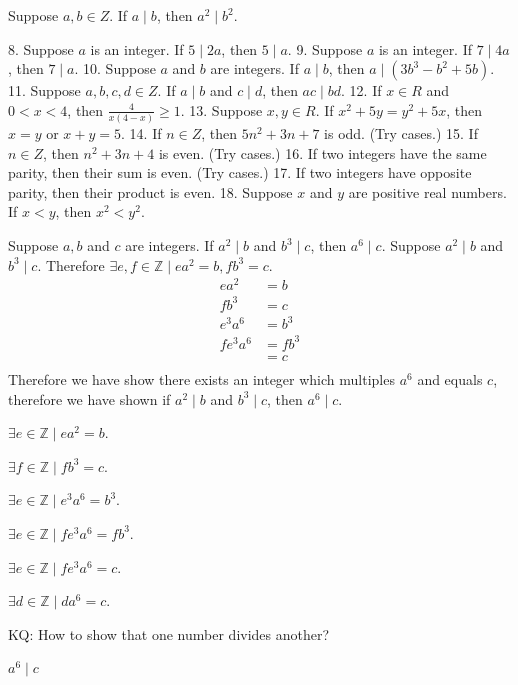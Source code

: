 \documentclass[openany, 12pt]{book}
\begin{document}
\begin{exercise}{}{}
	Suppose $a, b \in Z$. If $a \mid b$, then $a^2 \mid b^2$.
	\tcblower
\end{exercise}
8. Suppose $a$ is an integer. If $5 \mid 2 a$, then $5 \mid a$.
9. Suppose $a$ is an integer. If $7 \mid 4 a$, then $7 \mid a$.
10. Suppose $a$ and $b$ are integers. If $a \mid b$, then $a \mid\left(3 b^3-b^2+5 b\right)$.
11. Suppose $a, b, c, d \in Z$. If $a \mid b$ and $c \mid d$, then $a c \mid b d$.
12. If $x \in R$ and $0<x<4$, then $\frac{4}{x(4-x)} \geq 1$.
13. Suppose $x, y \in R$. If $x^2+5 y=y^2+5 x$, then $x=y$ or $x+y=5$.
14. If $n \in Z$, then $5 n^2+3 n+7$ is odd. (Try cases.)
15. If $n \in Z$, then $n^2+3 n+4$ is even. (Try cases.)
16. If two integers have the same parity, then their sum is even. (Try cases.)
17. If two integers have opposite parity, then their product is even.
18. Suppose $x$ and $y$ are positive real numbers. If $x<y$, then $x^2<y^2$.
\begin{exercise}{}{}
	Suppose $a, b$ and $c$ are integers. If $a^2 \mid b$ and $b^3 \mid c$, then $a^6
		\mid c$.
	\tcblower
	Suppose $a^2 \mid b$ and $b^3 \mid c$. Therefore $\exists
		e,f\in\mathbb{Z}\mid ea^2=b, fb^3=c$.
	\begin{align*}
		ea^2    & =b    \\
		fb^3    & =c    \\
		e^3a^6  & =b^3  \\
		fe^3a^6 & =fb^3 \\
		        & =c    \\
	\end{align*}
	Therefore we have show there exists an integer which multiples $a^6$ and
	equals $c$, therefore we have shown if $a^2 \mid b$ and $b^3 \mid c$, then
	$a^6 \mid c$.

	\begin{alist}
		\item $\exists e\in\mathbb{Z}\mid ea^2=b$.
		\item $\exists f\in\mathbb{Z}\mid fb^3=c$.
		\item $\exists e\in\mathbb{Z}\mid e^3a^6=b^3$.
		\item $\exists e\in\mathbb{Z}\mid fe^3a^6=fb^3$.
		\item $\exists e\in\mathbb{Z}\mid fe^3a^6=c$.
		\item $\exists d\in\mathbb{Z}\mid da^6=c$.
		\item KQ: How to show that one number divides another?
		\item $a^6 \mid c$
	\end{alist}
\end{exercise}
\end{document}
